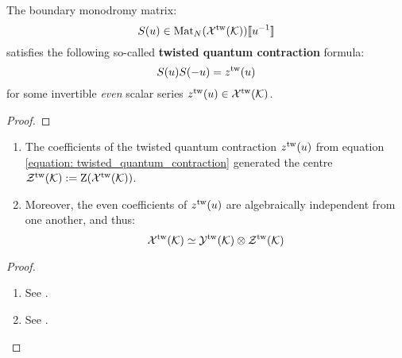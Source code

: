         \begin{lemma} \label{lemma: twisted_quantum_contractions}
            The boundary monodromy matrix:
                $$S(u) \in \operatorname{Mat}_N( \mathcal{X}^{\mathrm{tw}}(\mathcal{K}) )[\![u^{-1}]\!]$$
            satisfies the following so-called \textbf{twisted quantum contraction} formula:
                \begin{equation} \label{equation: twisted_quantum_contraction}
                    S(u) S(-u) = z^{\mathrm{tw}}(u)
                \end{equation}
            for some invertible \textit{even} scalar series $z^{\mathrm{tw}}(u) \in \mathcal{X}^{\mathrm{tw}}(\mathcal{K})$.
        \end{lemma}
            \begin{proof}
                
            \end{proof}
        \begin{lemma} \label{lemma: centres_of_extended_twisted_yangians}
            \begin{enumerate}
                \item The coefficients of the twisted quantum contraction $z^{\mathrm{tw}}(u)$ from equation \eqref{equation: twisted_quantum_contraction} generated the centre $\mathcal{Z}^{\mathrm{tw}}(\mathcal{K}) := \mathrm{Z}( \mathcal{X}^{\mathrm{tw}}(\mathcal{K}) )$.
                \item Moreover, the even coefficients of $z^{\mathrm{tw}}(u)$ are algebraically independent from one another, and thus:
                    $$\calX^{\tw}(\calK) \cong \calY^{\tw}(\calK) \tensor \calZ^{\tw}(\calK)$$
            \end{enumerate}
        \end{lemma}
            \begin{proof}
                \begin{enumerate}
                    \item See \cite[Corollary 3.5]{guay_regelskis_twisted_yangians_for_symmetric_pairs_of_types_BCD}.
                    \item See \cite[Corollary 3.6]{guay_regelskis_twisted_yangians_for_symmetric_pairs_of_types_BCD}.
                \end{enumerate}
            \end{proof}